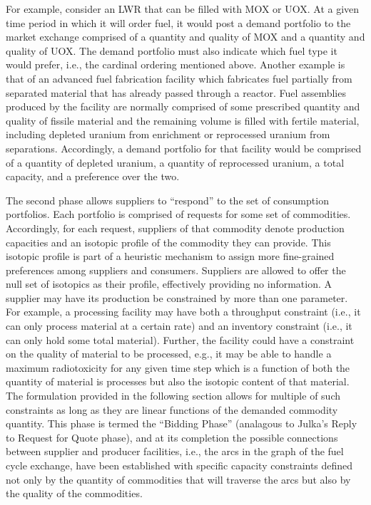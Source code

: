 For example, consider an LWR that can be filled with MOX or UOX. At a given time
period in which it will order fuel, it would post a demand portfolio to the
market exchange comprised of a quantity and quality of MOX and a quantity and
quality of UOX. The demand portfolio must also indicate which fuel type it would
prefer, i.e., the cardinal ordering mentioned above. Another example is that of
an advanced fuel fabrication facility which fabricates fuel partially from
separated material that has already passed through a reactor. Fuel assemblies
produced by the facility are normally comprised of some prescribed quantity and
quality of fissile material and the remaining volume is filled with fertile
material, including depleted uranium from enrichment or reprocessed uranium from
separations. Accordingly, a demand portfolio for that facility would be
comprised of a quantity of depleted uranium, a quantity of reprocessed uranium,
a total capacity, and a preference over the two.

The second phase allows suppliers to ``respond'' to the set of consumption
portfolios. Each portfolio is comprised of requests for some set of
commodities. Accordingly, for each request, suppliers of that commodity denote
production capacities and an isotopic profile of the commodity they can
provide. This isotopic profile is part of a heuristic mechanism to assign more
fine-grained preferences among suppliers and consumers. Suppliers are allowed to
offer the null set of isotopics as their profile, effectively providing no
information. A supplier may have its production be constrained by more than one
parameter. For example, a processing facility may have both a throughput
constraint (i.e., it can only process material at a certain rate) and an
inventory constraint (i.e., it can only hold some total material). Further, the
facility could have a constraint on the quality of material to be processed,
e.g., it may be able to handle a maximum radiotoxicity for any given time step
which is a function of both the quantity of material is processes but also the
isotopic content of that material. The formulation provided in the following
section allows for multiple of such constraints as long as they are linear
functions of the demanded commodity quantity. This phase is termed the ``Bidding
Phase'' (analagous to Julka's Reply to Request for Quote
phase\cite{julka_agent-based_2002}), and at its completion the possible
connections between supplier and producer facilities, i.e., the arcs in the
graph of the fuel cycle exchange, have been established with specific capacity
constraints defined not only by the quantity of commodities that will traverse
the arcs but also by the quality of the commodities.

